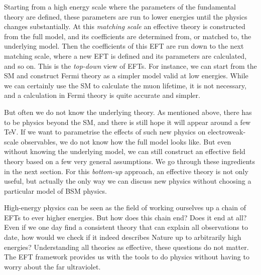 Starting from a high energy scale where the parameters of the
fundamental theory are defined, these parameters are run to lower
energies until the physics changes substantially. At this
\emph{matching scale} an effective theory is constructed from the full
model, and its coefficients are determined from, or matched to, the
underlying model. Then the coefficients of this EFT are run down to
the next matching scale, where a new EFT is defined and its parameters
are calculated, and so on. This is the \emph{top-down} view of
EFTs. For instance, we can start from the SM and construct Fermi
theory as a simpler model valid at low energies. While we can
certainly use the SM to calculate the muon lifetime, it is not
necessary, and a calculation in Fermi theory is quite accurate and
simpler.

But often we do not know the underlying theory. As mentioned above,
there has to be physics beyond the SM, and there is still hope it will
appear around a few TeV. If we want to parametrise the effects of such
new physics on electroweak-scale observables, we do not know how the
full model looks like. But even without knowing the underlying model,
we can still construct an effective field theory based on a few very
general assumptions. We go through these ingredients in the next
section. For this \emph{bottom-up} approach, an effective theory is
not only useful, but actually the only way we can discuss new physics
without choosing a particular model of BSM physics.

High-energy physics can be seen as the field of working ourselves up a
chain of EFTs to ever higher energies. But how does this chain end?
Does it end at all? Even if we one day find a consistent theory that
can explain all observations to date, how would we check if it indeed
describes Nature up to arbitrarily high energies? Understanding all
theories as effective, these questions do not matter. The EFT
framework provides us with the tools to do physics without having to
worry about the far ultraviolet.


